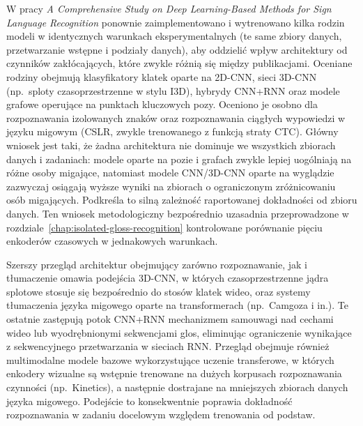 W pracy \emph{A Comprehensive Study on Deep Learning-Based Methods for Sign Language
Recognition} \cite{adaloglou2021comprehensive} ponownie zaimplementowano
 i wytrenowano kilka rodzin modeli w identycznych warunkach eksperymentalnych
(te same zbiory danych, przetwarzanie wstępne i podziały danych), aby oddzielić
wpływ architektury od czynników zakłócających, które zwykle różnią się między
publikacjami. Oceniane rodziny obejmują klasyfikatory klatek oparte na 2D-CNN,
sieci 3D-CNN (np.\ sploty czasoprzestrzenne w stylu I3D), hybrydy CNN+RNN oraz
modele grafowe operujące na punktach kluczowych pozy. Oceniono je osobno dla
rozpoznawania izolowanych znaków oraz rozpoznawania ciągłych wypowiedzi w języku
migowym (CSLR, zwykle trenowanego z funkcją straty CTC). Główny wniosek jest taki,
że żadna architektura nie dominuje we wszystkich zbiorach danych i zadaniach:
modele oparte na pozie i grafach zwykle lepiej uogólniają na różne osoby migające,
natomiast modele CNN/3D-CNN oparte na wyglądzie zazwyczaj osiągają wyższe wyniki
na zbiorach o ograniczonym zróżnicowaniu osób migających. Podkreśla to silną
zależność raportowanej dokładności od zbioru danych. Ten wniosek metodologiczny
bezpośrednio uzasadnia przeprowadzone w rozdziale~\ref{chap:isolated-gloss-recognition}
kontrolowane porównanie pięciu enkoderów czasowych w jednakowych warunkach.

Szerszy przegląd architektur obejmujący zarówno rozpoznawanie, jak i tłumaczenie
\cite{review2024dlprocessing} omawia podejścia 3D-CNN, w których czasoprzestrzenne
jądra splotowe stosuje się bezpośrednio do stosów klatek wideo, oraz systemy
tłumaczenia języka migowego oparte na transformerach (np.\ Camgoza i in.). Te
ostatnie zastępują potok CNN+RNN mechanizmem samouwagi nad cechami wideo lub
wyodrębnionymi sekwencjami glos, eliminując ograniczenie wynikające z sekwencyjnego
przetwarzania w sieciach RNN. Przegląd obejmuje również multimodalne modele
bazowe wykorzystujące uczenie transferowe, w których enkodery wizualne są
wstępnie trenowane na dużych korpusach rozpoznawania czynności (np.\ Kinetics),
a następnie dostrajane na mniejszych zbiorach danych języka migowego. Podejście
to konsekwentnie poprawia dokładność rozpoznawania w zadaniu docelowym względem
trenowania od podstaw.

